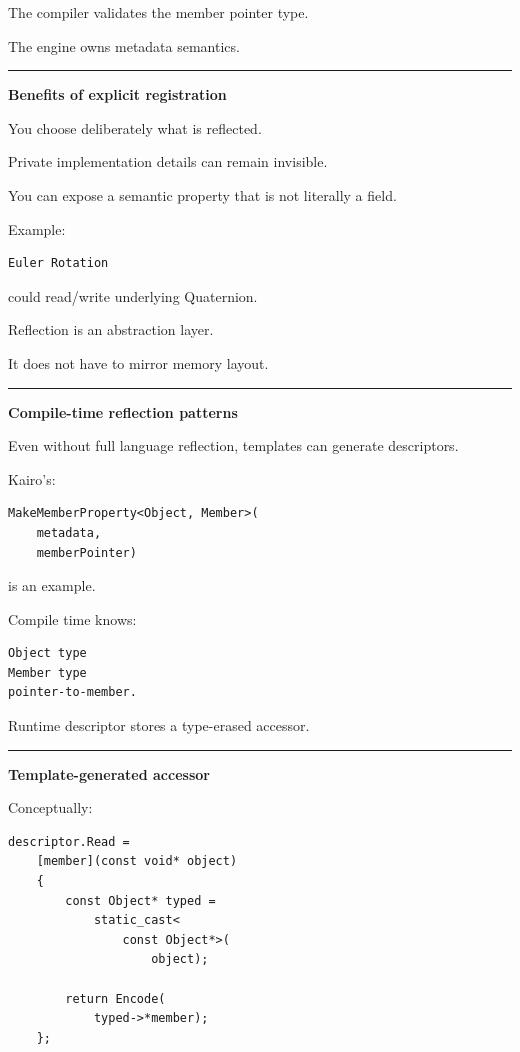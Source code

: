 The compiler validates the member pointer type.

The engine owns metadata semantics.

\begin{center}\rule{0.5\linewidth}{0.5pt}\end{center}

\textbf{Benefits of explicit registration}

You choose deliberately what is reflected.

Private implementation details can remain invisible.

You can expose a semantic property that is not literally a field.

Example:

\begin{verbatim}
Euler Rotation
\end{verbatim}

could read/write underlying Quaternion.

Reflection is an abstraction layer.

It does not have to mirror memory layout.

\begin{center}\rule{0.5\linewidth}{0.5pt}\end{center}

\textbf{Compile-time reflection patterns}

Even without full language reflection, templates can generate descriptors.

Kairo's:

\begin{verbatim}
MakeMemberProperty<Object, Member>(
    metadata,
    memberPointer)
\end{verbatim}

is an example.

Compile time knows:

\begin{verbatim}
Object type
Member type
pointer-to-member.
\end{verbatim}

Runtime descriptor stores a type-erased accessor.

\begin{center}\rule{0.5\linewidth}{0.5pt}\end{center}

\textbf{Template-generated accessor}

Conceptually:

\begin{verbatim}
descriptor.Read =
    [member](const void* object)
    {
        const Object* typed =
            static_cast<
                const Object*>(
                    object);

        return Encode(
            typed->*member);
    };
\end{verbatim}

